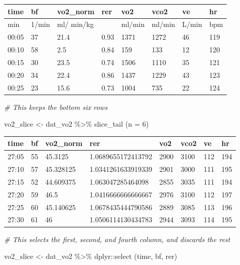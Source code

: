 \documentclass[
]{book}
\newenvironment{Shaded}{\begin{snugshade}}{\end{snugshade}}
\newcommand{\AttributeTok}[1]{\textcolor[rgb]{0.77,0.63,0.00}{#1}}
\newcommand{\CommentTok}[1]{\textcolor[rgb]{0.56,0.35,0.01}{\textit{#1}}}
\newcommand{\DecValTok}[1]{\textcolor[rgb]{0.00,0.00,0.81}{#1}}
\newcommand{\FunctionTok}[1]{\textcolor[rgb]{0.00,0.00,0.00}{#1}}
\newcommand{\NormalTok}[1]{#1}
\newcommand{\OtherTok}[1]{\textcolor[rgb]{0.56,0.35,0.01}{#1}}
\newcommand{\SpecialCharTok}[1]{\textcolor[rgb]{0.00,0.00,0.00}{#1}}
\begin{document}
\begin{tabular}{l|l|l|l|l|l|l|l}
\hline
time & bf & vo2\_norm & rer & vo2 & vco2 & ve & hr\\
\hline
min & 1/min & ml/ min/kg &  & ml/min & ml/min & L/min & bpm\\
\hline
00:05 & 37 & 21.4 & 0.93 & 1371 & 1272 & 46 & 119\\
\hline
00:10 & 58 & 2.5 & 0.84 & 159 & 133 & 12 & 120\\
\hline
00:15 & 30 & 23.5 & 0.74 & 1506 & 1110 & 35 & 121\\
\hline
00:20 & 34 & 22.4 & 0.86 & 1437 & 1229 & 43 & 123\\
\hline
00:25 & 23 & 15.6 & 0.73 & 1004 & 735 & 22 & 124\\
\hline
\end{tabular}

\begin{Shaded}
\begin{Highlighting}[]
\CommentTok{\# This keeps the bottom six rows}

\NormalTok{vo2\_slice }\OtherTok{\textless{}{-}}\NormalTok{ dat\_vo2 }\SpecialCharTok{\%\textgreater{}\%} 
  \FunctionTok{slice\_tail}\NormalTok{ (}\AttributeTok{n =} \DecValTok{6}\NormalTok{) }
\end{Highlighting}
\end{Shaded}

\begin{tabular}{l|l|l|l|l|l|l|l}
\hline
time & bf & vo2\_norm & rer & vo2 & vco2 & ve & hr\\
\hline
27:05 & 55 & 45.3125 & 1.0689655172413792 & 2900 & 3100 & 112 & 194\\
\hline
27:10 & 57 & 45.328125 & 1.0341261633919339 & 2901 & 3000 & 111 & 195\\
\hline
27:15 & 52 & 44.609375 & 1.063047285464098 & 2855 & 3035 & 111 & 194\\
\hline
27:20 & 59 & 46.5 & 1.0416666666666667 & 2976 & 3100 & 112 & 197\\
\hline
27:25 & 60 & 45.140625 & 1.0678435444790586 & 2889 & 3085 & 113 & 196\\
\hline
27:30 & 61 & 46 & 1.0506114130434783 & 2944 & 3093 & 114 & 195\\
\hline
\end{tabular}

\begin{Shaded}
\begin{Highlighting}[]
\CommentTok{\# This selects the first, second, and fourth column, and discards the rest}

\NormalTok{vo2\_slice }\OtherTok{\textless{}{-}}\NormalTok{ dat\_vo2 }\SpecialCharTok{\%\textgreater{}\%}
\NormalTok{  dplyr}\SpecialCharTok{::}\FunctionTok{select}\NormalTok{ (time, bf, rer) }
\end{Highlighting}
\end{Shaded}
\end{document}
